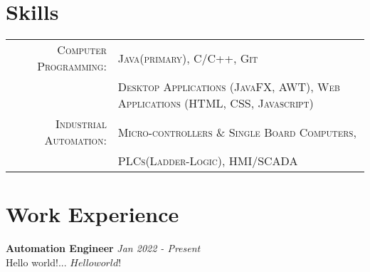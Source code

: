 \documentclass[a4paper]{article}
\begin{document}
\section{Skills}
\begin{tabular}{rl}	\small{}
 \small{}\textsc{Computer Programming:} & \small{}\textsc{Java(primary)}, \textsc{C/C++}, \textsc{Git}\\
  & \small{}\textsc{Desktop Applications (JavaFX, AWT)}, \textsc{Web Applications (HTML, CSS, Javascript)}\\
   \small{}\textsc{Industrial Automation:} & \small{}\textsc{Micro-controllers \& Single Board Computers},\\%
 & \textsc{PLCs(Ladder-Logic)}, \textsc{HMI/SCADA}\\
\end{tabular}

\section{Work Experience}
\textbf{Automation Engineer} \hfill \emph {Jan 2022 - Present}\\







Hello world!...
$Hello world!$ %
\end{document}
